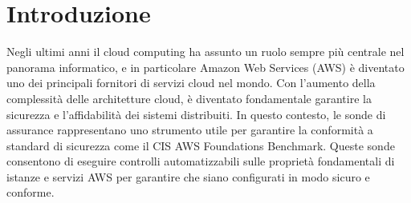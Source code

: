 \chapter{Introduzione}
\label{cap:introduzione}
    
Negli ultimi anni il cloud computing ha assunto un ruolo sempre più centrale nel panorama informatico, e in particolare Amazon Web Services (AWS) è diventato uno dei principali fornitori di servizi cloud nel mondo. Con l'aumento della complessità delle architetture cloud, è diventato fondamentale garantire la sicurezza e l'affidabilità dei sistemi distribuiti. In questo contesto, le sonde di assurance rappresentano uno strumento utile per garantire la conformità a standard di sicurezza come il CIS AWS Foundations Benchmark. Queste sonde consentono di eseguire controlli automatizzabili sulle proprietà fondamentali di istanze e servizi AWS per garantire che siano configurati in modo sicuro e conforme.
